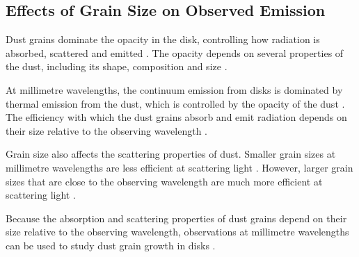 \subsection{Effects of Grain Size on Observed Emission}
\label{sec: intro_dust_grainsize}

Dust grains dominate the opacity in the disk, controlling how radiation is absorbed, scattered and emitted \citep{Williams}. The opacity depends on several properties of the dust, including its shape, composition and size \citep{Kataoka_2015}. 

At millimetre wavelengths, the continuum emission from disks is dominated by thermal emission from the dust, which is controlled by the opacity of the dust \citep{Testi}. The efficiency with which the dust grains absorb and emit radiation depends on their size relative to the observing wavelength  \citep{Testi}. 

Grain size also affects the scattering properties of dust. Smaller grain sizes at millimetre wavelengths are less efficient at scattering light \citep{Kataoka_2015}. However, larger grain sizes that are close to the observing wavelength are much more efficient at scattering light \citep{Kataoka_2015}.

Because the absorption and scattering properties of dust grains depend on their size relative to the observing wavelength, observations at millimetre wavelengths can be used to study dust grain growth in disks \citep{Testi}. 

















